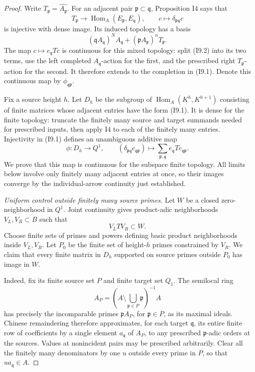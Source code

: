 \begin{proof}
Write $T_{\mathfrak p}=\widehat{A_{\mathfrak p}}$. For an adjacent
pair $\mathfrak p\subset\mathfrak q$, Proposition I4 says that
\[
 T_{\mathfrak p}\longrightarrow
 \operatorname{Hom}_A(E_{\mathfrak p},E_{\mathfrak q}),
 \qquad c\longmapsto\delta_{\mathfrak p\mathfrak q}c
                                                        \tag{I9.1}
\]
is injective with dense image. Its induced topology has a basis
\[
 (\mathfrak qA_{\mathfrak q})^N A_{\mathfrak q}
       +(\mathfrak pA_{\mathfrak p})^nT_{\mathfrak p}.
                                                        \tag{I9.2}
\]
The map $c\mapsto e_{\mathfrak q}Tc$ is continuous for this mixed
topology: split (I9.2) into its two terms, use the left completed
$A_{\mathfrak q}$-action for the first, and the prescribed right
$T_{\mathfrak p}$-action for the second. It therefore extends to
the completion in (I9.1). Denote this continuous map by
$\phi_{\mathfrak q\mathfrak p}$.

Fix a source height $h$. Let $D_h$ be the subgroup of
$\operatorname{Hom}_A(K^h,K^{h+1})$ consisting of finite matrices
whose adjacent entries have the form (I9.1). It is dense for the
finite topology: truncate the finitely many source and target
summands needed for prescribed inputs, then apply I4 to each of
the finitely many entries. Injectivity in (I9.1) defines an
unambiguous additive map
\[
 \phi:D_h\longrightarrow Q^1,
 \qquad (\delta_{\mathfrak p\mathfrak q}c_{\mathfrak q\mathfrak p})
       \longmapsto
       \sum_{\mathfrak p,\mathfrak q}
                    e_{\mathfrak q}Tc_{\mathfrak q\mathfrak p}.
                                                        \tag{I9.3}
\]
We prove that this map is continuous for the subspace finite
topology. All limits below involve only finitely many adjacent
entries at once, so their images converge by the individual-arrow
continuity just established.

\emph{Uniform control outside finitely many source primes.}
Let $W$ be a closed zero-neighborhood in $Q^1$. Joint continuity
gives product-adic neighborhoods $V_L,V_R\subset B$ such that
\[
                         V_L T V_R\subset W.              \tag{I9.4}
\]
Choose finite sets of primes and powers defining basic product
neighborhoods inside $V_L,V_R$. Let $P_0$ be the finite set of
height-$h$ primes constrained by $V_R$. We claim that every finite
matrix in $D_h$ supported on source primes outside $P_0$ has image
in $W$.

Indeed, fix its finite source set $P$ and finite target set $Q_1$.
The semilocal ring
\[
 A_P=(A\setminus\bigcup_{\mathfrak p\in P}\mathfrak p)^{-1}A
\]
has precisely the incomparable primes $\mathfrak pA_P$, for
$\mathfrak p\in P$, as its maximal ideals. Chinese remaindering
therefore approximates, for each target $\mathfrak q$, its entire
finite row of coefficients by a single element $a_{\mathfrak q}$
of $A_P$, to any prescribed $\mathfrak p$-adic orders at the
sources. Values at nonincident pairs may be prescribed arbitrarily.
Clear all the finitely many denominators by one $u$ outside every
prime in $P$, so that $u a_{\mathfrak q}\in A$.


\end{proof}

